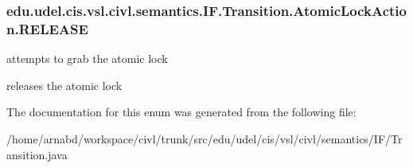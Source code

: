 \subsubsection[{R\+E\+L\+E\+A\+S\+E}]{\setlength{\rightskip}{0pt plus 5cm}edu.\+udel.\+cis.\+vsl.\+civl.\+semantics.\+I\+F.\+Transition.\+Atomic\+Lock\+Action.\+R\+E\+L\+E\+A\+S\+E}\label{enumedu_1_1udel_1_1cis_1_1vsl_1_1civl_1_1semantics_1_1IF_1_1Transition_1_1AtomicLockAction_a7b34285695881974511fa13ab99861b7}


attempts to grab the atomic lock 

releases the atomic lock 

The documentation for this enum was generated from the following file\+:\begin{DoxyCompactItemize}
\item 
/home/arnabd/workspace/civl/trunk/src/edu/udel/cis/vsl/civl/semantics/\+I\+F/Transition.\+java\end{DoxyCompactItemize}
